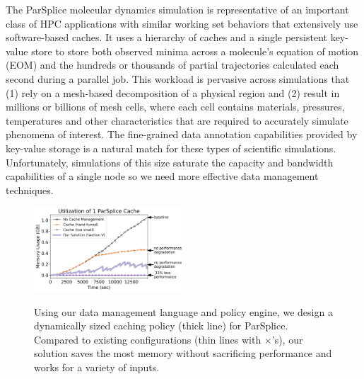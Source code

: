The ParSplice molecular dynamics simulation is representative of an important
class of HPC applications with similar working set behaviors that extensively
use software-based caches. It uses a hierarchy of caches and a single
persistent key-value store to store both observed minima across a molecule's
equation of motion (EOM) and the hundreds or thousands of partial trajectories
calculated each second during a parallel job.  This workload is pervasive
across simulations that (1) rely on a mesh-based decomposition of a physical
region and (2) result in millions or billions of mesh cells, where each cell
contains materials, pressures, temperatures and other characteristics that are
required to accurately simulate phenomena of interest.  The fine-grained data
annotation capabilities provided by key-value storage is a natural match for
these types of scientific simulations.  Unfortunately, simulations of this size
saturate the capacity and bandwidth capabilities of a single node so we need
more effective data management techniques.

\begin{figure}[t]
\noindent\includegraphics[width=0.5\textwidth]{./chapters/controlplane/parsplice/figures/cache-management.png}\\
\caption{Using our data management language and policy engine, we design a
dynamically sized caching policy (thick line) for ParSplice.  Compared to
existing configurations (thin lines with \(\times\)'s), our solution saves the most
memory without sacrificing performance and works for a variety of inputs.
\label{fig:cache-management}}
\end{figure}

